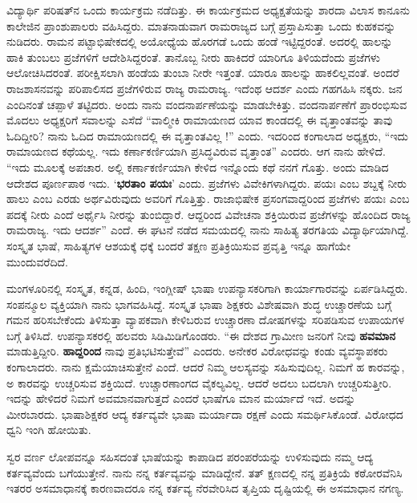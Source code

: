 {ವಿದ್ಯಾರ್ಥಿ ಪರಿಷತ್‍ನ ಒಂದು ಕಾರ್ಯಕ್ರಮ ನಡೆದಿತ್ತು.  ಈ ಕಾರ್ಯಕ್ರಮದ ಅಧ್ಯಕ್ಷತೆ\-ಯನ್ನು ಶಾರದಾ ವಿಲಾಸ ಕಾನೂನು ಕಾಲೇಜಿನ ಪ್ರಾಂಶುಪಾಲರು ವಹಿಸಿದ್ದರು.  ಮಾತನಾಡುವಾಗ ರಾಮರಾಜ್ಯದ ಬಗ್ಗೆ ಪ್ರಸ್ತಾಪಿಸುತ್ತಾ ಒಂದು ಕುಹಕವನ್ನು ನುಡಿದರು.  ರಾಮನ ಪಟ್ಟಾಭಿಷೇಕದಲ್ಲಿ ಅಯೋಧ್ಯೆಯ ಹೊರಗಡೆ ಒಂದು ಹಂಡೆ ಇಟ್ಟಿದ್ದ\-ರಂತೆ.  ಅದರಲ್ಲಿ ಹಾಲನ್ನು ಹಾಕಿ ತುಂಬಲು ಪ್ರಜೆಗಳಿಗೆ ಆದೇಶಿಸಿದ್ದರಂತೆ.  ತಾನೊಬ್ಬ ನೀರು ಹಾಕಿದರೆ ಯಾರಿಗೂ ತಿಳಿಯದೆಂದು ಪ್ರಜೆಗಳು ಆಲೋಚಿಸಿದರಂತೆ. ಪರೀಕ್ಷಿ\-ಸಲಾಗಿ ಹಂಡೆಯ ತುಂಬಾ ನೀರೇ ಇತ್ತಂತೆ.  ಯಾರೂ ಹಾಲನ್ನು ಹಾಕಲಿಲ್ಲವಂತೆ.  ಅಂದರೆ ರಾಜಶಾಸನವನ್ನು ಪರಿಪಾಲಿಸದ ಪ್ರಜೆಗಳಿರುವ ರಾಜ್ಯ ರಾಮರಾಜ್ಯ.  ಇದೆಂಥ ಆದರ್ಶ ಎಂದು ಗಹಗಹಿಸಿ ನಕ್ಕರು.  ಜನ ಎಂದಿನಂತೆ ಚಪ್ಪಾಳೆ ತಟ್ಟಿದರು.  ಅಂದು ನಾನು ವಂದನಾರ್ಪಣೆಯನ್ನು ಮಾಡಬೇಕಿತ್ತು.  ವಂದನಾರ್ಪಣೆಗೆ ಪ್ರಾರಂಭಿಸುವ ಮೊದಲು ಅಧ್ಯಕ್ಷರಿಗೆ ಸವಾಲನ್ನು ಎಸೆದೆ  “ವಾಲ್ಮೀಕಿ ರಾಮಾಯಣದ ಯಾವ ಕಾಂಡದಲ್ಲಿ ಈ ವೃತ್ತಾಂತವನ್ನು ತಾವು ಓದಿದ್ದೀರಿ?  ನಾನು ಓದಿದ ರಾಮಾಯಣದಲ್ಲಿ ಈ ವೃತ್ತಾಂತವಿಲ್ಲ !” ಎಂದು.  ಇದರಿಂದ ಕಂಗಾಲಾದ ಅಧ್ಯಕ್ಷರು, “ಇದು ರಾಮಾಯಣದ ಕಥೆಯಲ್ಲ. ಇದು ಕರ್ಣಾಕರ್ಣಿಯಾಗಿ ಪ್ರಸಿದ್ಧವಿರುವ ವೃತ್ತಾಂತ” ಎಂದರು.  ಆಗ ನಾನು ಹೇಳಿದೆ.  “ಇದು ಮೂಲಕ್ಕೆ ಅಪಚಾರ.  ಅಲ್ಲಿ ಕರ್ಣಾಕರ್ಣಿಯಾಗಿ ಕೇಳಿದ ಇನ್ನೊಂದು ಕಥೆ ನನಗೆ ಗೊತ್ತು. ಅಂದು ಮಾಡಿದ ಆದೇಶದ ಪೂರ್ಣಪಾಠ ಇದು.  ‘\textbf{ಭರತಾಂ ಪಯಃ}’ ಎಂದು.  ಪ್ರಜೆಗಳು ವಿವೇಕಿಗಳಾಗಿದ್ದರು.  ಪಯಃ ಎಂಬ ಶಬ್ದಕ್ಕೆ ನೀರು ಹಾಲು ಎಂಬ ಎರಡು ಅರ್ಥವಿರುವುದು ಅವರಿಗೆ ಗೊತ್ತಿತ್ತು.  ರಾಜಾಭಿಷೇಕ ಪ್ರಸಂಗವಾದ್ದರಿಂದ ಪ್ರಜೆಗಳು ಪಯಃ ಎಂಬ ಪದಕ್ಕೆ ನೀರು ಎಂದೆ ಅರ್ಥೈಸಿ ನೀರನ್ನು ತುಂಬಿದ್ದಾರೆ. ಆದ್ದರಿಂದ ವಿವೇಚನಾ ಶಕ್ತಿಯಿರುವ ಪ್ರಜೆಗಳನ್ನು ಹೊಂದಿದ ರಾಜ್ಯ ರಾಮರಾಜ್ಯ.  ಇದು ಆದರ್ಶ” ಎಂದೆ.  ಈ ಘಟನೆ ನಡೆದ ಸಮಯದಲ್ಲಿ ನಾನು ಸಾಹಿತ್ಯ ತರಗತಿಯ ವಿದ್ಯಾರ್ಥಿ\-ಯಾಗಿದ್ದೆ.  ಸಂಸ್ಕೃತ ಭಾಷೆ, ಸಾಹಿತ್ಯಗಳ ಆಶಯಕ್ಕೆ ಧಕ್ಕೆ ಬಂದರೆ ತಕ್ಷಣ ಪ್ರತಿಕ್ರಿಯಿಸುವ ಪ್ರವೃತ್ತಿ ಇನ್ನೂ ಹಾಗೆಯೇ ಮುಂದುವರೆದಿದೆ.   

ಮಂಗಳೂರಿನಲ್ಲಿ ಸಂಸ್ಕೃತ, ಕನ್ನಡ, ಹಿಂದಿ, ಇಂಗ್ಲೀಷ್ ಭಾಷಾ ಉಪನ್ಯಾಸಕರಿಗಾಗಿ ಕಾರ್ಯಾಗಾರವನ್ನು ಏರ್ಪಡಿಸಿದ್ದರು.  ಸಂಪನ್ಮೂಲ ವ್ಯಕ್ತಿಯಾಗಿ ನಾನು ಭಾಗವಹಿಸಿದ್ದೆ.  ಸಂಸ್ಕೃತ ಭಾಷಾ ಶಿಕ್ಷಕರು ವಿಶೇಷವಾಗಿ ಶುದ್ಧ ಉಚ್ಚಾರಣೆಯ ಬಗ್ಗೆ ಗಮನ ಹರಿಸ\-ಬೇಕೆಂದು ತಿಳಿಸುತ್ತಾ ವ್ಯಾಪಕವಾಗಿ ಕೇಳಿಬರುವ ಉಚ್ಚಾರಣಾ ದೋಷಗಳನ್ನು ಸರಿಪಡಿಸುವ ಉಪಾಯಗಳ ಬಗ್ಗೆ ತಿಳಿಸಿದೆ.  ಉಪನ್ಯಾಸಕರಲ್ಲಿ ಹಲವರು ಸಿಡಿಮಿಡಿಗೊಂಡರು.  “ಈ ದೇಶದ ಗ್ರಾಮೀಣ ಜನರಿಗೆ ನೀವು \textbf{ಹವಮಾನ} ಮಾಡುತ್ತಿದ್ದೀರಿ.  \textbf{ಹಾದ್ದರಿಂದ} ನಾವು ಪ್ರತಿಭಟಿಸುತ್ತೇವೆ” ಎಂದರು.  ಅನೇಕರ ವಿರೋಧವನ್ನು ಕಂಡು ವ್ಯವಸ್ಥಾಪಕರು ಕಂಗಾಲಾದರು. ನಾನು ಕ್ಷಮೆಯಾಚಿಸುತ್ತೇನೆ  ಎಂದೆ.   ಆದರೆ ನಿಮ್ಮ ಆಲಸ್ಯವನ್ನು ಸಹಿಸು\-ವುದಿಲ್ಲ.  ನಿಮಗೆ ಹ ಕಾರವನ್ನು, ಅ ಕಾರವನ್ನು ಉಚ್ಚರಿಸುವ ಶಕ್ತಿಯಿದೆ.  ಉಚ್ಚಾರಣಾಂಗದ ವೈಕಲ್ಯವಿಲ್ಲ.  ಆದರೆ ಅದಲು ಬದಲಾಗಿ ಉಚ್ಚರಿಸುತ್ತೀರಿ.  ಇದನ್ನು ಹೇಳಿದರೆ ನಿಮಗೆ ಅವಮಾನವಾಗುತ್ತದೆ ಎಂದರೆ ಭಾಷೆಗೂ ಮಾನ  \enginline{-}  ಮರ್ಯಾದೆ ಇದೆ.  ಅದನ್ನು ಮೀರಬಾರದು.  ಭಾಷಾಶಿಕ್ಷಕರ ಆದ್ಯ ಕರ್ತವ್ಯವೇ ಭಾಷಾ ಮರ್ಯಾದಾ ರಕ್ಷಣೆ ಎಂದು ಸಮರ್ಥಿಸಿಕೊಂಡೆ.  ವಿರೋಧದ ಧ್ವನಿ ಇಂಗಿ ಹೋಯಿತು. 

ಸ್ವರ ವರ್ಣ ಲೋಪವನ್ನೂ ಸಹಿಸದಂತೆ ಭಾಷೆಯನ್ನು ಕಾಪಾಡಿದ ಪರಂಪರೆಯನ್ನು ಉಳಿಸುವುದು ನಮ್ಮ ಆದ್ಯ ಕರ್ತವ್ಯವೆಂದು ಬಗೆಯುತ್ತೇನೆ.  ನಾನು ನನ್ನ ಕರ್ತವ್ಯವನ್ನು ಮಾಡಿದ್ದೇನೆ.  ತತ್ ಕ್ಷಣದಲ್ಲಿ ನನ್ನ ಪ್ರತಿಕ್ರಿಯೆ ಕಠೋರವೆನಿಸಿ ಇತರರ ಅಸಮಾಧಾನಕ್ಕೆ ಕಾರಣವಾದರೂ ನನ್ನ ಕರ್ತವ್ಯ ನೆರವೇರಿಸಿದ ತೃಪ್ತಿಯ ದೃಷ್ಟಿಯಲ್ಲಿ ಈ ಅಸಮಾಧಾನ ನಗಣ್ಯ.

}
